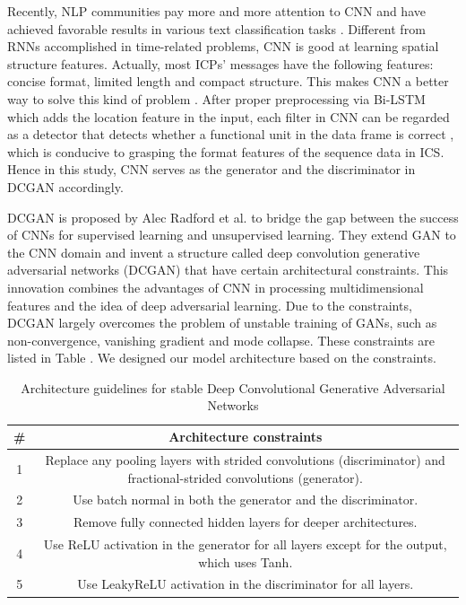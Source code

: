 Recently, NLP communities pay more and more attention to CNN and have achieved favorable results in various text classification tasks \cite{kim2014convolutional,zhang2015character}. Different from RNNs accomplished in time-related problems, CNN is good at learning spatial structure features. Actually, most ICPs’ messages have the following features: concise format, limited length and compact structure. This makes CNN a better way to solve this kind of problem \cite{kim2014convolutional}. After proper preprocessing via Bi-LSTM which adds the location feature in the input, each filter in CNN can be regarded as a detector that detects whether a functional unit in the data frame is correct \cite{adel2016exploring}, which is conducive to grasping the format features of the sequence data in ICS.  Hence in this study, CNN serves as the generator and the discriminator in DCGAN accordingly.

DCGAN is proposed by Alec Radford et al. \cite{radford2015unsupervised} to bridge the gap between the success of CNNs for supervised learning and unsupervised learning. They extend GAN to the CNN domain and invent a structure called deep convolution generative adversarial networks (DCGAN) that have certain architectural constraints. This innovation combines the advantages of CNN in processing multidimensional features and the idea of deep adversarial learning. Due to the constraints, DCGAN largely overcomes the problem of unstable training of GANs, such as non-convergence, vanishing gradient and mode collapse.  These constraints are listed in Table \uppercase\expandafter{}. We designed our model architecture based on the constraints.


\begin{table}[htbp]
\caption{Architecture guidelines for stable Deep Convolutional Generative Adversarial Networks}
\label{table_example}
\centering
\begin{tabular}{|c|c|}
\hline
\bfseries \# & \bfseries Architecture constraints\\
\hline
1 & \multicolumn{1}{m{7cm}|}{Replace any pooling layers with strided convolutions (discriminator) and fractional-strided convolutions (generator).}\\
\hline
2 & \multicolumn{1}{m{7cm}|}{Use batch normal in both the generator and the discriminator.} \\
\hline
3 & \multicolumn{1}{m{7cm}|}{Remove fully connected hidden layers for deeper architectures.} \\
\hline
4 & \multicolumn{1}{m{7cm}|}{Use ReLU activation in the generator for all layers except for the output, which uses Tanh.}\\
\hline
5 & \multicolumn{1}{m{7cm}|}{Use LeakyReLU activation in the discriminator for all layers.}\\
\hline
\end{tabular}
\end{table}


